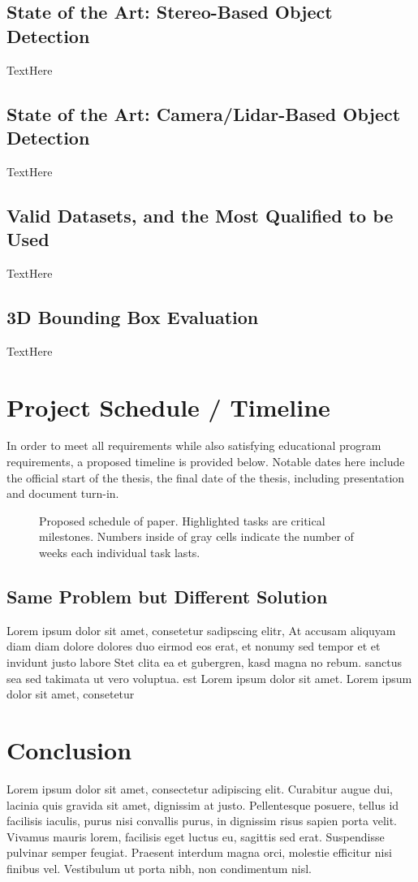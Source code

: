 \subsection{State of the Art: Stereo-Based Object Detection}
TextHere

\subsection{State of the Art: Camera/Lidar-Based Object Detection}
TextHere

\subsection{Valid Datasets, and the Most Qualified to be Used}
TextHere

\subsection{3D Bounding Box Evaluation}
TextHere

\section{Project Schedule / Timeline}
In order to meet all requirements while also satisfying educational program requirements, a proposed timeline is provided below. Notable dates here include the official start of the thesis, the final date of the thesis, including presentation and document turn-in.

\begin{figure}[h] %
    \caption{Proposed schedule of paper. Highlighted tasks are critical milestones. Numbers inside of gray cells indicate the number of weeks each individual task lasts.}
\end{figure}


\subsection{Same Problem but Different Solution}
Lorem ipsum dolor sit amet, consetetur sadipscing elitr, At accusam aliquyam diam diam dolore dolores duo eirmod eos erat, et nonumy sed tempor et et invidunt justo labore Stet clita ea et gubergren, kasd magna no rebum. sanctus sea sed takimata ut vero voluptua. est Lorem ipsum dolor sit amet. Lorem ipsum dolor sit amet, consetetur\\
\section{Conclusion}
 Lorem ipsum dolor sit amet, consectetur adipiscing elit. Curabitur augue dui, lacinia quis gravida sit amet, dignissim at justo. Pellentesque posuere, tellus id facilisis iaculis, purus nisi convallis purus, in dignissim risus sapien porta velit. Vivamus mauris lorem, facilisis eget luctus eu, sagittis sed erat. Suspendisse pulvinar semper feugiat. Praesent interdum magna orci, molestie efficitur nisi finibus vel. Vestibulum ut porta nibh, non condimentum nisl.
